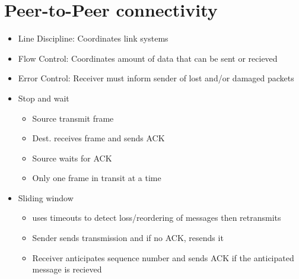 \documentclass{article}
\begin{document}
    \section{Peer-to-Peer connectivity}
    \begin{itemize}
        \item Line Discipline: Coordinates link systems
        \item Flow Control: Coordinates amount of data that can be sent or recieved
        \item Error Control: Receiver must inform sender of lost and/or damaged packets
        \item Stop and wait
        \begin{itemize}
            \item Source transmit frame
            \item Dest. receives frame and sends ACK
            \item Source waits for ACK
            \item Only one frame in transit at a time
        \end{itemize}
        \item Sliding window
        \begin{itemize}
            \item uses timeouts to detect loss/reordering of messages then retransmits
            \item Sender sends transmission and if no ACK, resends it
            \item Receiver anticipates sequence number and sends ACK if the anticipated message is recieved
        \end{itemize}
    \end{itemize}
\end{document}
